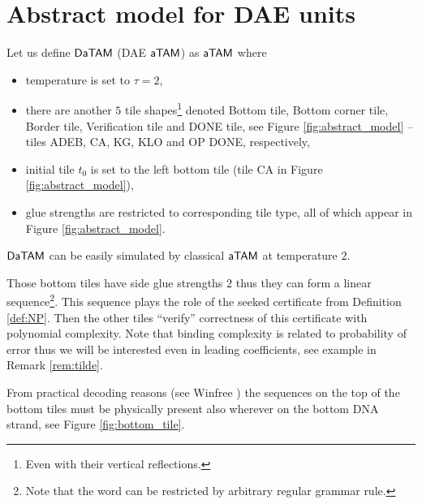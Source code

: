 \section{Abstract model for DAE units}

\begin{defn}
	Let us define $\mathsf{DaTAM}$ (DAE $\mathsf{aTAM}$) as $\mathsf{aTAM}$ where
	\begin{itemize}
		\item temperature is set to $\tau = 2$,
		\item there are another $5$ tile shapes\footnote{Even with their vertical reflections.} denoted Bottom tile, Bottom corner tile, Border tile, Verification tile and DONE tile, see Figure \ref{fig:abstract_model} -- tiles {\sf ADEB}, {\sf CA}, {\sf KG}, {\sf KLO} and {\sf OP DONE}, respectively,
		\item initial tile $t_0$ is set to the left bottom tile (tile {\sf CA} in Figure \ref{fig:abstract_model}),
		\item glue strengths are restricted to corresponding tile type, all of which appear in Figure \ref{fig:abstract_model}.
	\end{itemize}
\end{defn}

\begin{note}
	$\mathsf{DaTAM}$ can be easily simulated by classical $\mathsf{aTAM}$ at temperature $2$.
\end{note}

Those bottom tiles have side glue strengths $2$ thus they can form a linear sequence\footnote{Note that the word can be restricted by arbitrary regular grammar rule.}. This sequence plays the role of the seeked certificate from Definition \ref{def:NP}. Then the other tiles ``verify'' correctness of this certificate with polynomial complexity. Note that binding complexity is related to probability of error thus we will be interested even in leading coefficients, see example in Remark \ref{rem:tilde}.

From practical decoding reasons (see Winfree \cite{winfree_phd}) the sequences on the top of the bottom tiles must be physically present also wherever on the bottom DNA strand, see Figure \ref{fig:bottom_tile}.

